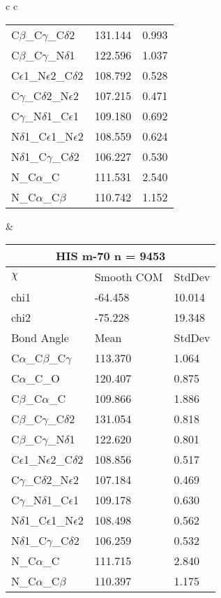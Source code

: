 \begin{longtable}{ c c }
\begin{tabular}{ l l l }
  C$\beta$\_C$\gamma$\_C$\delta$2 & 131.144 & 0.993\\
  C$\beta$\_C$\gamma$\_N$\delta$1 & 122.596 & 1.037\\
  C$\epsilon$1\_N$\epsilon$2\_C$\delta$2 & 108.792 & 0.528\\
  C$\gamma$\_C$\delta$2\_N$\epsilon$2 & 107.215 & 0.471\\
  C$\gamma$\_N$\delta$1\_C$\epsilon$1 & 109.180 & 0.692\\
  N$\delta$1\_C$\epsilon$1\_N$\epsilon$2 & 108.559 & 0.624\\
  N$\delta$1\_C$\gamma$\_C$\delta$2 & 106.227 & 0.530\\
  N\_C$\alpha$\_C & 111.531 & 2.540\\
  N\_C$\alpha$\_C$\beta$ & 110.742 & 1.152\\
  \bottomrule
  \end{tabular}
  &
  \begin{tabular}{ l l l }
  \toprule
  \multicolumn{3}{c}{HIS \textbf{m-70} n = 9453} \\ \toprule
  $\chi$       & Smooth COM & StdDev \\ \midrule
  chi1 & -64.458 & 10.014 \\ 
  chi2 & -75.228 & 19.348 \\ \midrule
  Bond Angle   & Mean     & StdDev \\ \midrule
  C$\alpha$\_C$\beta$\_C$\gamma$ & 113.370 & 1.064\\
  C$\alpha$\_C\_O & 120.407 & 0.875\\
  C$\beta$\_C$\alpha$\_C & 109.866 & 1.886\\
  C$\beta$\_C$\gamma$\_C$\delta$2 & 131.054 & 0.818\\
  C$\beta$\_C$\gamma$\_N$\delta$1 & 122.620 & 0.801\\
  C$\epsilon$1\_N$\epsilon$2\_C$\delta$2 & 108.856 & 0.517\\
  C$\gamma$\_C$\delta$2\_N$\epsilon$2 & 107.184 & 0.469\\
  C$\gamma$\_N$\delta$1\_C$\epsilon$1 & 109.178 & 0.630\\
  N$\delta$1\_C$\epsilon$1\_N$\epsilon$2 & 108.498 & 0.562\\
  N$\delta$1\_C$\gamma$\_C$\delta$2 & 106.259 & 0.532\\
  N\_C$\alpha$\_C & 111.715 & 2.840\\
  N\_C$\alpha$\_C$\beta$ & 110.397 & 1.175\\
  \bottomrule
  \end{tabular}
  \\

\end{longtable}
